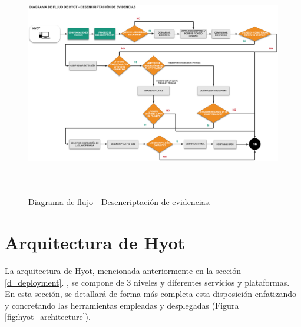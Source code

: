 \documentclass[12pt,a4paper, twoside]{report}
\begin{document}
  	\begin{figure}[!ht]   
		\caption{Diagrama de flujo - Desencriptación de evidencias.} 
		\begin{center} 
	 		\includegraphics[width=18cm,height=9.2cm]{Images/implement/hyot_decryptionflow} \\
			\label{fig:hyot_decryptionflow} 
		\end{center}  
	\end{figure}
		
	\section{Arquitectura de Hyot}
	
	La arquitectura de Hyot, mencionada anteriormente en la sección \ref{d_deployment}. , se compone de 3 niveles y diferentes servicios y plataformas. En esta sección, se detallará de forma más completa esta disposición enfatizando y concretando las herramientas empleadas y desplegadas (Figura \ref{fig:hyot_architecture}).
	
\end{document}
